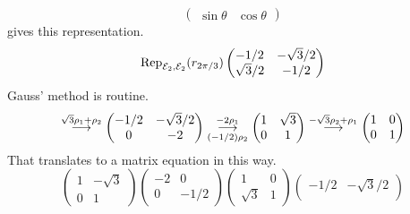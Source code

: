 \begin{exercises}
\begin{answer}
\begin{equation*}
\begin{pmatrix}
              \sin\theta  &\cos\theta
            \end{pmatrix}
          \end{equation*}
          gives this representation.
          \begin{equation*}
            \rep{r_{2\pi/3}}{\stdbasis_2,\stdbasis_2}
            \begin{pmatrix}
              -1/2        &-\sqrt{3}/2  \\
              \sqrt{3}/2  &-1/2
            \end{pmatrix}
          \end{equation*}
          Gauss' method is routine.
          \begin{equation*}
            \grstep{\sqrt{3}\rho_1+\rho_2}
            \begin{pmatrix}
              -1/2        &-\sqrt{3}/2  \\
               0          &-2
            \end{pmatrix}
            \grstep[(-1/2)\rho_2]{-2\rho_1}
            \begin{pmatrix}
               1          &\sqrt{3}    \\
               0          &1
            \end{pmatrix}
            \grstep{-\sqrt{3}\rho_2+\rho_1}
            \begin{pmatrix}
               1          &0   \\
               0          &1
            \end{pmatrix}
          \end{equation*}
          That translates to a matrix equation in this way.
          \begin{equation*}
            \begin{pmatrix}
              1  &-\sqrt{3}  \\
              0  &1
            \end{pmatrix}
            \begin{pmatrix}
              -2  &0    \\
               0  &-1/2
            \end{pmatrix}
            \begin{pmatrix}
               1         &0  \\
               \sqrt{3}  &1
            \end{pmatrix}
            \begin{pmatrix}
              -1/2        &-\sqrt{3}/2  \\

\end{pmatrix}
\end{equation*}
\end{answer}
\end{exercises}
